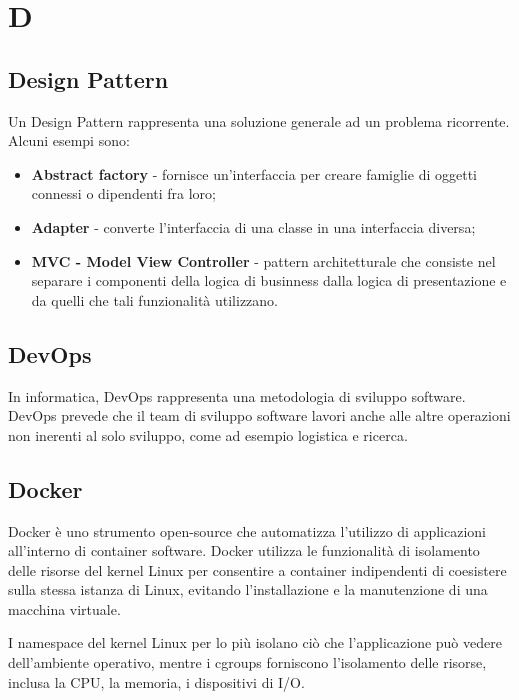 \section{D}

    \subsection*{Design Pattern}

        Un Design Pattern rappresenta una soluzione generale ad un problema ricorrente.
        Alcuni esempi sono:

        \begin{itemize}
            \item \textbf{Abstract factory} - fornisce un'interfaccia per creare famiglie di oggetti connessi o
                                                dipendenti fra loro;
            \item \textbf{Adapter} - converte l'interfaccia di una classe in una interfaccia diversa;
            \item \textbf{MVC - Model View Controller} - pattern architetturale che consiste nel separare i componenti
                                                            della logica di businness dalla logica di presentazione e
                                                            da quelli che tali funzionalità utilizzano.
        \end{itemize}

    \subsection*{DevOps}

        In informatica, DevOps rappresenta una metodologia di sviluppo software.
        DevOps prevede che il team di sviluppo software lavori anche alle altre operazioni non inerenti al solo
        sviluppo, come ad esempio logistica e ricerca.

    \subsection*{Docker}

        Docker è uno strumento open-source che automatizza l'utilizzo di applicazioni all'interno di container software. Docker utilizza le funzionalità di isolamento delle risorse
        del kernel Linux per consentire a container indipendenti di coesistere sulla stessa istanza di Linux, evitando l'installazione e la manutenzione di una macchina virtuale.

        I namespace del kernel Linux per lo più isolano ciò che l'applicazione può vedere dell'ambiente operativo, mentre i cgroups forniscono l'isolamento delle risorse, inclusa
        la CPU, la memoria, i dispositivi di I/O.
